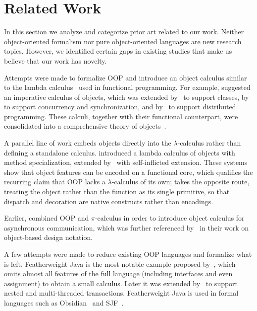 
\section{Related Work}\label{sec:related}

In this section we analyze and categorize prior art related to our work.
Neither object-oriented formalism nor pure object-oriented languages
  are new research topics.
However, we identified certain gaps in existing studies
  that make us believe that our work has novelty.

Attempts were made to formalize OOP and introduce an object calculus
  similar to the lambda calculus~\citep{barendregt2012}
  used in functional programming.
For example, \citet{abadi1995imperative} suggested an imperative
  calculus of objects, which was extended by~\citet{bono1998imperative}
  to support classes, by~\citet{gordon1998concurrent} to support concurrency
  and synchronization, and by~\citet{jeffrey1999distributed}
  to support distributed programming.
These calculi, together with their functional counterpart,
  were consolidated into a comprehensive
  theory of objects~\citep{abadi1996theory}.

A parallel line of work embeds objects directly into the
  \(\lambda\)-calculus rather than defining a standalone calculus.
\citet{mitchell1993lambda} introduced a lambda calculus of objects
  with method specialization, extended by~\citet{di1998lambda}
  with self-inflicted extension.
These systems show that object features can be encoded on a functional core,
  which qualifies the recurring claim that OOP lacks
  a \(\lambda\)-calculus of its own; \phic{} takes the opposite route,
  treating the object rather than the function as its single primitive,
  so that dispatch and decoration are native constructs rather than encodings.

Earlier, \citet{honda1991object} combined OOP and \(\pi\)-calculus in order
  to introduce object calculus for asynchronous communication,
  which was further referenced by~\citet{jones1993pi} in their work
  on object-based design notation.

A few attempts were made to reduce existing OOP languages
  and formalize what is left.
Featherweight Java is the most notable example proposed
  by~\citet{igarashi2001featherweight}, which omits almost all features
  of the full language (including interfaces and even assignment)
  to obtain a small calculus.
Later it was extended by~\citet{jagannathan2005transactional}
  to support nested and multi-threaded transactions.
Featherweight Java is used in formal languages such as
  Obsidian~\citep{coblenz2019} and SJF~\citep{usov2020}.

